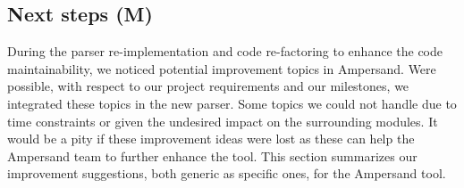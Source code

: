 
\subsection{Next steps (M)}
\label{subsec:design-next-steps}

During the parser re-implementation and code re-factoring to enhance the code maintainability, we noticed potential improvement topics in Ampersand.
Were possible, with respect to our project requirements and our milestones, we integrated these topics in the new parser.
Some topics we could not handle due to time constraints or given the undesired impact on the surrounding modules.
It would be a pity if these improvement ideas were lost as these can help the Ampersand team to further enhance the tool.
This section summarizes our improvement suggestions, both generic as specific ones, for the Ampersand tool.

